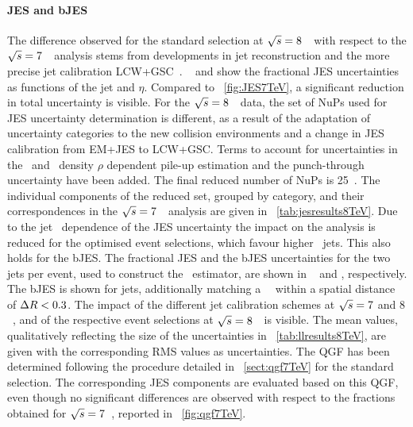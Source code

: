 \paragraph{\gls{JES} and \gls{bJES}}\mbox{}
%
The difference observed for the standard selection at ${\sqrt{s}}=8$~\TeV\ with respect to the ${\sqrt{s}}=7$~\TeV\ analysis stems from developments in jet reconstruction and the more precise jet calibration \gls{LCW}+\gls{GSC}~\cite{ATLAS-CONF-2015-057,ATLAS-CONF-2015-017}. ~ and  show the fractional \gls{JES} uncertainties as functions of the jet \pt and $\eta$. Compared to \fig~\ref{fig:JES7TeV}, a significant reduction in total uncertainty is visible.
%
For the ${\sqrt{s}}=8$~\TeV\ data, the set of \glspl{NuP} used for \gls{JES} uncertainty determination is different, as a result of the adaptation of uncertainty categories to the new collision environments and a change in \gls{JES} calibration from \gls{EM}+\gls{JES} to \gls{LCW}+\gls{GSC}. Terms to account for uncertainties in the \pt\ and \pt\ density $\rho$ dependent pile-up estimation and the punch-through uncertainty have been added. The final reduced number of \glspl{NuP} is 25~\cite{JESRecommendations2012Twiki}. The individual components of the reduced set, grouped by category, and their correspondences in the ${\sqrt{s}}=7$~\TeV\ analysis are given in \tab~\ref{tab:jesresults8TeV}. 
%
Due to the jet \pt\ dependence of the \gls{JES} uncertainty the impact on the analysis is reduced for the optimised event selections, which favour higher \pt\ jets. This also holds for the \gls{bJES}. 
%
The fractional \gls{JES} and the \gls{bJES} uncertainties for the two jets per event, used to construct the \mlbr\ estimator, are shown in \fig~ and , respectively. The \gls{bJES} is shown for jets, additionally matching a \genlevel\ \bquark\ within a spatial distance of $\Delta R<0.3$. The impact of the different jet calibration schemes at ${\sqrt{s}}=7$ and $8$~\TeV, and of the respective event selections at ${\sqrt{s}}=8$~\TeV\ is visible. The mean values, qualitatively reflecting the size of the uncertainties in \tab~\ref{tab:llresults8TeV}, are given with the corresponding \gls{RMS} values as uncertainties.
%
The \gls{QGF} has been determined following the procedure detailed in \sect~\ref{sect:qgf7TeV} for the standard selection. The corresponding \gls{JES} components are evaluated based on this \gls{QGF}, even though no significant differences are observed with respect to the fractions obtained for ${\sqrt{s}}=7$~\TeV, reported in \fig~\ref{fig:qgf7TeV}.
%
%
%
%
